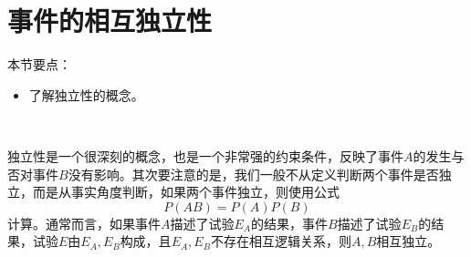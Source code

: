 \section{事件的相互独立性}

本节要点：
\begin{itemize}
    \item 了解独立性的概念。
\end{itemize}

~

独立性是一个很深刻的概念，也是一个非常强的约束条件，反映了事件$A$的发生与否对事件$B$没有影响。其次要注意的是，我们一般不从定义判断两个事件是否独立，而是从事实角度判断，如果两个事件独立，则使用公式
\[
P\left( AB \right) =P\left( A \right) P\left( B \right)
\]
计算。通常而言，如果事件$A$描述了试验$E_A$的结果，事件$B$描述了试验$E_B$的结果，试验$E$由$E_A,E_B$构成，且$E_A,E_B$不存在相互逻辑关系，则$A,B$相互独立。





